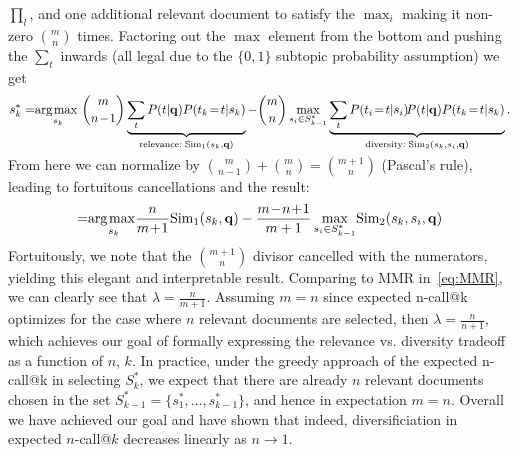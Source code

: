 $\prod_l$, and one additional relevant document to satisfy the
$\max_i$ making it non-zero $\binom{m}{n}$ times.  Factoring out the
$\max$ element from the bottom and pushing the $\sum_t$ inwards (all legal
due to the $\{0,1\}$ subtopic probability assumption) we get
\begin{align}
s_k^* = & \argmax_{s_k} \binom{m}{n\!-\!1} \underbrace{\sum_t P(t|\vec{q}) P(t_k\!=\!t|s_k)}_{\textrm{relevance}: \; \Sim_1(s_k,\vec{q})} - \binom{m}{n} \max_{s_i \in S_{k-1}^*} \underbrace{\sum_t P(t_i\!=\!t|s_i) \!P(t|\vec{q}) P(t_k\!=\!t|s_k)}_{\textrm{diversity}: \; \Sim_2(s_k,s_i,\vec{q})} \nonumber .\\[-7mm] \nonumber
\end{align}  
From here we can 
normalize by $\binom{m}{n-1} + \binom{m}{n} = \binom{m+1}{n}$ 
(Pascal's rule), leading to fortuitous cancellations and the result:
\begin{align}
=  & \argmax_{s_k} \!\! \frac{n}{m\!+\!1} \Sim_1(s_k,\vec{q}) - \frac{m\!-\!n\!+\!1}{m+1} \max_{s_i \in S_{k-1}^*} \! \Sim_2(s_k,s_i,\vec{q}) \nonumber \\[-6mm] \nonumber
\end{align}
Fortuitously, we note that the $\binom{m+1}{n}$ divisor cancelled with
the numerators, yielding this elegant and interpretable result.
Comparing to MMR in~\eqref{eq:MMR}, we can clearly see that $\lambda =
\frac{n}{m\!+\!1}$.  Assuming $m = n$
since expected n-call@k optimizes for the case where $n$ relevant documents are selected, then $\lambda = \frac{n}{n\!+\!1}$, which achieves our goal of formally expressing the relevance vs. diversity tradeoff as a function of $n$, $k$. In practice, under the greedy approach of the expected n-call@k in selecting $S_k^*$, we expect that there are already $n$ relevant documents chosen in the set $S_{k-1}^* = \{s_1^*, \dots, s_{k-1}^*\}$, and hence in expectation $m=n$.
Overall we have achieved our goal and have shown that
indeed, diversificiation in expected $n$-call@$k$ decreases linearly 
as $n \to 1$.


